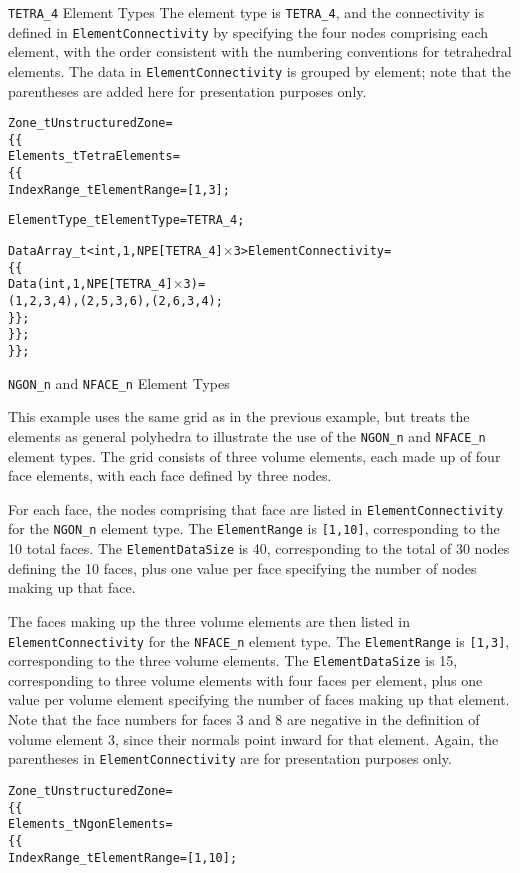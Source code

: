 \begin{changes}
\begin{example}{\texttt{TETRA\_4} Element Types}
The element type is \texttt{TETRA\_4}, and the connectivity is defined
in \texttt{ElementConnectivity} by specifying the four nodes comprising
each element, with the order consistent with the
numbering conventions for tetrahedral
elements.
The data in \texttt{ElementConnectivity} is grouped by element; note
that the parentheses are added here for presentation purposes only.
\begin{alltt}
  Zone\_t UnstructuredZone =
    \{\{
    Elements\_t TetraElements =
      \{\{
      IndexRange\_t ElementRange = [1,3] ;

      ElementType\_t ElementType = TETRA\_4 ;

      DataArray\_t<int, 1, NPE[TETRA\_4]\(\times\)3> ElementConnectivity =
        \{\{
        Data(int, 1, NPE[TETRA\_4]\(\times\)3) =
          (1, 2, 3, 4), (2, 5, 3, 6), (2, 6, 3, 4) ;
        \}\} ;
      \}\} ;
    \}\} ;
\end{alltt}
\end{example}

\begin{example}{\texttt{NGON\_n} and \texttt{NFACE\_n} Element Types}
\label{ex:elements2}

This example uses the same grid as in the previous example, but
treats the elements as general polyhedra to illustrate the use of the
\texttt{NGON\_n} and \texttt{NFACE\_n} element types.
The grid consists of three volume elements, each made up of four face
elements, with each face defined by three nodes.

For each face, the nodes comprising that face are listed in
\texttt{ElementConnectivity} for the \texttt{NGON\_n} element type.
The \texttt{ElementRange} is \texttt{[1,10]}, corresponding to the 10
total faces.
The \texttt{ElementDataSize} is 40, corresponding to the total of 30
nodes defining the 10 faces, plus one value per face specifying the
number of nodes making up that face.

The faces making up the three volume elements are then listed in
\texttt{ElementConnectivity} for the \texttt{NFACE\_n} element type.
The \texttt{ElementRange} is \texttt{[1,3]}, corresponding to the three
volume elements.
The \texttt{ElementDataSize} is 15, corresponding to three volume
elements with four faces per element, plus one value per volume element
specifying the number of faces making up that element.
Note that the face numbers for faces 3 and 8 are negative in the
definition of volume element 3, since their normals point inward for
that element.
Again, the parentheses in \texttt{ElementConnectivity} are for
presentation purposes only.
\begin{alltt}
  Zone\_t UnstructuredZone =
    \{\{
    Elements\_t NgonElements =
      \{\{
      IndexRange\_t ElementRange = [1,10] ;


\end{alltt}
\end{example}
\end{changes}
